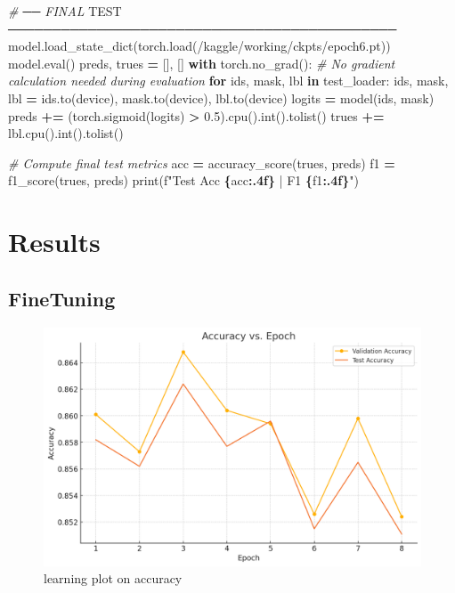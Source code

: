 \documentclass[
]{article}
\newenvironment{Shaded}{\begin{snugshade}}{\end{snugshade}}
\newcommand{\AlertTok}[1]{\textcolor[rgb]{0.94,0.16,0.16}{#1}}
\newcommand{\BuiltInTok}[1]{#1}
\newcommand{\CommentTok}[1]{\textcolor[rgb]{0.56,0.35,0.01}{\textit{#1}}}
\newcommand{\ControlFlowTok}[1]{\textcolor[rgb]{0.13,0.29,0.53}{\textbf{#1}}}
\newcommand{\FloatTok}[1]{\textcolor[rgb]{0.00,0.00,0.81}{#1}}
\newcommand{\KeywordTok}[1]{\textcolor[rgb]{0.13,0.29,0.53}{\textbf{#1}}}
\newcommand{\NormalTok}[1]{#1}
\newcommand{\OperatorTok}[1]{\textcolor[rgb]{0.81,0.36,0.00}{\textbf{#1}}}
\newcommand{\SpecialCharTok}[1]{\textcolor[rgb]{0.81,0.36,0.00}{\textbf{#1}}}
\newcommand{\SpecialStringTok}[1]{\textcolor[rgb]{0.31,0.60,0.02}{#1}}
\newcommand{\StringTok}[1]{\textcolor[rgb]{0.31,0.60,0.02}{#1}}
\begin{document}
\begin{Shaded}
\begin{Highlighting}[]
\CommentTok{\# ── FINAL }\AlertTok{TEST}\CommentTok{ ────────────────────────────────────────────}
\NormalTok{model.load\_state\_dict(torch.load(}\StringTok{\textquotesingle{}/kaggle/working/ckpts/epoch6.pt\textquotesingle{}}\NormalTok{))  }
\NormalTok{model.}\BuiltInTok{eval}\NormalTok{()}
\NormalTok{preds, trues }\OperatorTok{=}\NormalTok{ [], []}
\ControlFlowTok{with}\NormalTok{ torch.no\_grad():   }\CommentTok{\# No gradient calculation needed during evaluation}
    \ControlFlowTok{for}\NormalTok{ ids, mask, lbl }\KeywordTok{in}\NormalTok{ test\_loader:}
\NormalTok{        ids, mask, lbl }\OperatorTok{=}\NormalTok{ ids.to(device), mask.to(device), lbl.to(device)}
\NormalTok{        logits }\OperatorTok{=}\NormalTok{ model(ids, mask)}
\NormalTok{        preds }\OperatorTok{+=}\NormalTok{ (torch.sigmoid(logits) }\OperatorTok{\textgreater{}} \FloatTok{0.5}\NormalTok{).cpu().}\BuiltInTok{int}\NormalTok{().tolist()}
\NormalTok{        trues }\OperatorTok{+=}\NormalTok{ lbl.cpu().}\BuiltInTok{int}\NormalTok{().tolist()}
        
\CommentTok{\# Compute final test metrics}
\NormalTok{acc }\OperatorTok{=}\NormalTok{ accuracy\_score(trues, preds)   }
\NormalTok{f1  }\OperatorTok{=}\NormalTok{ f1\_score(trues, preds)}
\BuiltInTok{print}\NormalTok{(}\SpecialStringTok{f"Test Acc }\SpecialCharTok{\{}\NormalTok{acc}\SpecialCharTok{:.4f\}}\SpecialStringTok{ | F1 }\SpecialCharTok{\{}\NormalTok{f1}\SpecialCharTok{:.4f\}}\SpecialStringTok{"}\NormalTok{)}
\end{Highlighting}
\end{Shaded}

\section{Results}\label{results}

\subsection{FineTuning}\label{finetuning}

\begin{figure}
\centering
\includegraphics[width=0.5\linewidth,height=\textheight,keepaspectratio]{images/Robertector_Accuracy.png}
\caption{learning plot on accuracy}
\end{figure}
\end{document}

